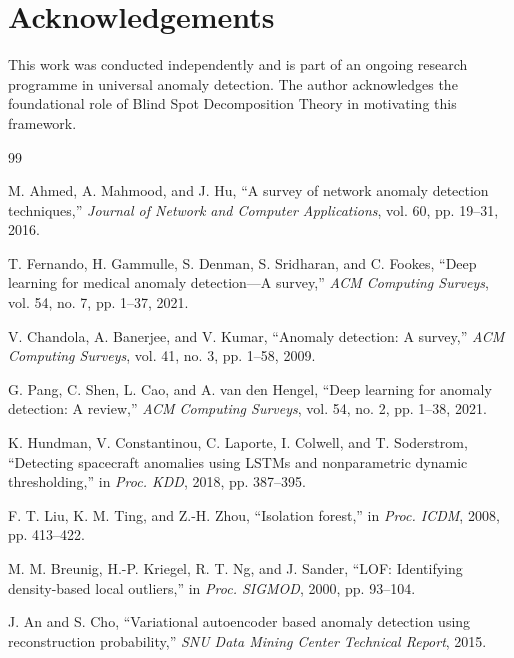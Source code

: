 \documentclass[journal]{IEEEtran}
\begin{document}
\section*{Acknowledgements}
This work was conducted independently and is part of an ongoing research programme in universal anomaly detection. The author acknowledges the foundational role of Blind Spot Decomposition Theory in motivating this framework.

\begin{thebibliography}{99}

M. Ahmed, A. Mahmood, and J. Hu, ``A survey of network anomaly detection techniques,'' \textit{Journal of Network and Computer Applications}, vol. 60, pp. 19--31, 2016.

T. Fernando, H. Gammulle, S. Denman, S. Sridharan, and C. Fookes, ``Deep learning for medical anomaly detection---A survey,'' \textit{ACM Computing Surveys}, vol. 54, no. 7, pp. 1--37, 2021.

V. Chandola, A. Banerjee, and V. Kumar, ``Anomaly detection: A survey,'' \textit{ACM Computing Surveys}, vol. 41, no. 3, pp. 1--58, 2009.

G. Pang, C. Shen, L. Cao, and A. van den Hengel, ``Deep learning for anomaly detection: A review,'' \textit{ACM Computing Surveys}, vol. 54, no. 2, pp. 1--38, 2021.

K. Hundman, V. Constantinou, C. Laporte, I. Colwell, and T. Soderstrom, ``Detecting spacecraft anomalies using LSTMs and nonparametric dynamic thresholding,'' in \textit{Proc. KDD}, 2018, pp. 387--395.

F. T. Liu, K. M. Ting, and Z.-H. Zhou, ``Isolation forest,'' in \textit{Proc. ICDM}, 2008, pp. 413--422.

M. M. Breunig, H.-P. Kriegel, R. T. Ng, and J. Sander, ``LOF: Identifying density-based local outliers,'' in \textit{Proc. SIGMOD}, 2000, pp. 93--104.

J. An and S. Cho, ``Variational autoencoder based anomaly detection using reconstruction probability,'' \textit{SNU Data Mining Center Technical Report}, 2015.


\end{thebibliography}
\end{document}
